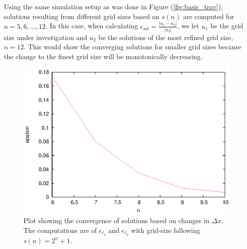  Using the same simulation setup as was done in Figure (\ref{fig:basic_trav}), solutions resulting from different grid sizes based on $s(n)$ are computed for $n = 5, 6, \ldots, 12$.
 In this case, when calculating $\epsilon_{sol} = \frac{| u_1 - u_2 |}{|u_2|}$, we let $u_1$ be the grid size under investigation and $u_2$ be the solutions of the most refined grid size, $n = 12$.
 This would show the converging solutions for smaller grid sizes because the change to the finest grid size will be monotonically decreasing.

 \begin{figure}
   \centering
   \includegraphics{converge_spatial}
   \caption{Plot showing the convergence of solutions based on changes in $\Delta x$. The computations are of $\epsilon_{\ell_1}$ and $\epsilon_{\ell_2}$ with grid-size following $s(n) = 2^{n}+1$.}
   \label{fig:converge_spatial}
 \end{figure}

